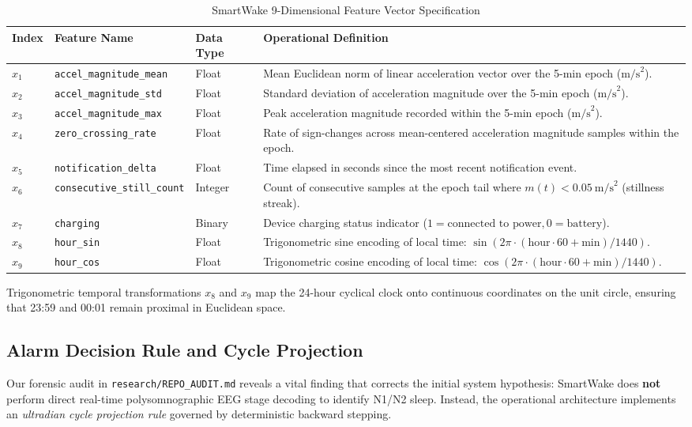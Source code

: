 \documentclass[journal,11pt,onecolumn]{IEEEtran}
\begin{document}
\begin{table}[h]
\centering
\caption{SmartWake 9-Dimensional Feature Vector Specification}
\label{tab:feature_schema}
\begin{tabular}{lllp{6.5cm}}
\toprule
\textbf{Index} & \textbf{Feature Name} & \textbf{Data Type} & \textbf{Operational Definition} \\
\midrule
$x_1$ & \texttt{accel\_magnitude\_mean} & Float & Mean Euclidean norm of linear acceleration vector over the 5-min epoch ($\text{m/s}^2$). \\
$x_2$ & \texttt{accel\_magnitude\_std} & Float & Standard deviation of acceleration magnitude over the 5-min epoch ($\text{m/s}^2$). \\
$x_3$ & \texttt{accel\_magnitude\_max} & Float & Peak acceleration magnitude recorded within the 5-min epoch ($\text{m/s}^2$). \\
$x_4$ & \texttt{zero\_crossing\_rate} & Float & Rate of sign-changes across mean-centered acceleration magnitude samples within the epoch. \\
$x_5$ & \texttt{notification\_delta} & Float & Time elapsed in seconds since the most recent notification event. \\
$x_6$ & \texttt{consecutive\_still\_count} & Integer & Count of consecutive samples at the epoch tail where $m(t) < 0.05~\text{m/s}^2$ (stillness streak). \\
$x_7$ & \texttt{charging} & Binary & Device charging status indicator ($1 = \text{connected to power}, 0 = \text{battery}$). \\
$x_8$ & \texttt{hour\_sin} & Float & Trigonometric sine encoding of local time: $\sin(2\pi \cdot (\text{hour}\cdot 60 + \text{min}) / 1440)$. \\
$x_9$ & \texttt{hour\_cos} & Float & Trigonometric cosine encoding of local time: $\cos(2\pi \cdot (\text{hour}\cdot 60 + \text{min}) / 1440)$. \\
\bottomrule
\end{tabular}
\end{table}

Trigonometric temporal transformations $x_8$ and $x_9$ map the 24-hour cyclical clock onto continuous coordinates on the unit circle, ensuring that 23:59 and 00:01 remain proximal in Euclidean space.

\subsection{Alarm Decision Rule and Cycle Projection}
Our forensic audit in \texttt{research/REPO\_AUDIT.md} reveals a vital finding that corrects the initial system hypothesis: SmartWake does \textbf{not} perform direct real-time polysomnographic EEG stage decoding to identify N1/N2 sleep. Instead, the operational architecture implements an \textit{ultradian cycle projection rule} governed by deterministic backward stepping.
\end{document}
